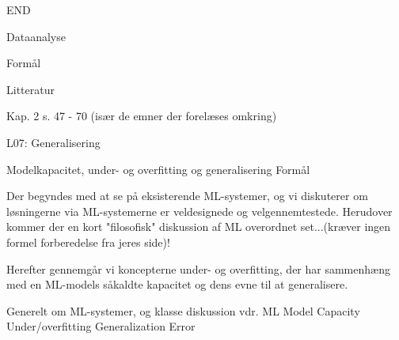 








END


Dataanalyse

Formål


Litteratur

Kap. 2  s. 47 - 70 (især de emner der forelæses omkring)




L07: Generalisering

Modelkapacitet, under- og overfitting og generalisering
Formål

Der begyndes med at se på eksisterende ML-systemer, og vi diskuterer om
løsningerne via ML-systemerne er veldesignede og velgennemtestede.  Herudover
kommer der en kort "filosofisk" diskussion af ML overordnet set...(kræver ingen
formel forberedelse fra jeres side)!

Herefter gennemgår vi koncepterne under- og overfitting, der har sammenhæng med
en ML-models såkaldte kapacitet og dens evne til at generalisere.

    Generelt om ML-systemer, og klasse diskussion vdr. ML
    Model Capacity
    Under/overfitting
    Generalization Error

